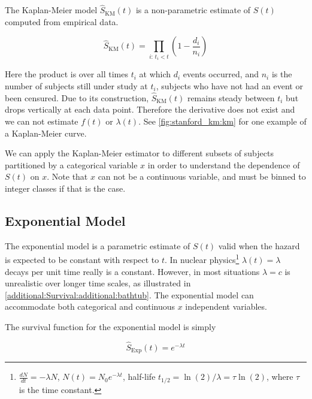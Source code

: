 The Kaplan-Meier model \cite{km} $\hat{S}_{\text{KM}}\left(t\right)$ is a non-parametric
estimate of $S\left(t\right)$ computed from empirical data.

\begin{equation}\label{eq:Survival:km}
\hat{S}_{\text{KM}}\left(t\right) = \prod_{i:\,t_{i} < t} \left(1 - \frac{d_{i}}{n_{i}}\right)
\end{equation}

\noindent Here the product is over all times $t_{i}$ at which $d_{i}$ events occurred,
and $n_{i}$ is the number of subjects still under study at $t_{i}$,
\ie subjects who have not had an event or been censured.
Due to its construction, $\hat{S}_{\text{KM}}\left(t\right)$ remains steady
between $t_{i}$ but drops vertically at each data point.
Therefore the derivative does not exist and we can not estimate $f\left(t\right)$ or $\lambda\left(t\right)$.
See \cref{fig:stanford_km:km} for one example of a Kaplan-Meier curve.

We can apply the Kaplan-Meier estimator to different subsets of subjects partitioned by a categorical variable $x$
in order to understand the dependence of $S\left(t\right)$ on $x$.
Note that $x$ can not be a continuous variable, and must be binned to integer classes if that is the case.

\subsection{Exponential Model}
\label{additional:Survival:exp}

The exponential model is a parametric estimate of $S\left(t\right)$
valid when the hazard is expected to be constant with respect to $t$.
In nuclear physics\footnote{$\frac{dN}{dt} = -\lambda N$, $N\left(t\right) = N_{0} e^{-\lambda t}$,
half-life $t_{1/2} = \ln\left(2\right) / \lambda = \tau \ln\left(2\right)$, where $\tau$ is the time constant.} $\lambda\left(t\right) = \lambda$
decays per unit time really is a constant.
However, in most situations $\lambda = c$ is unrealistic over longer time scales,
as illustrated in \cref{additional:Survival:additional:bathtub}.
The exponential model can accommodate both categorical and continuous $x$ independent variables.

The survival function for the exponential model is simply

\begin{equation}\label{eq:Survival:exp}
\hat{S}_{\text{Exp}}\left(t\right) = e^{-\lambda t}
\end{equation}

